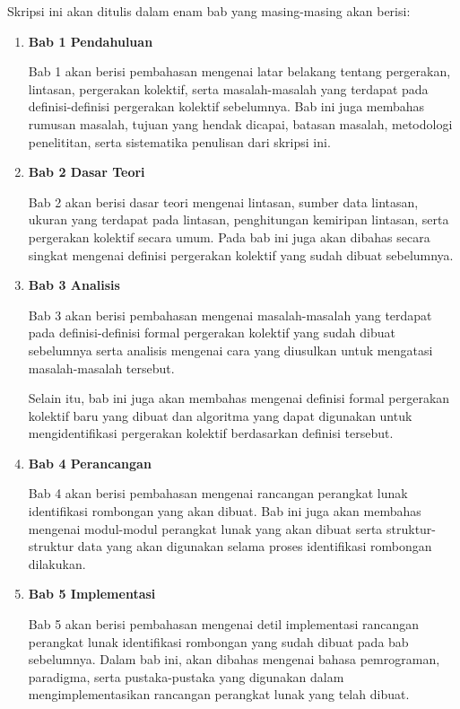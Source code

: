 Skripsi ini akan ditulis dalam enam bab yang masing-masing akan berisi:

\begin{enumerate}
    \item \textbf{Bab 1 Pendahuluan}
    
    Bab 1 akan berisi pembahasan mengenai latar belakang tentang pergerakan, lintasan, pergerakan kolektif, serta masalah-masalah yang terdapat pada definisi-definisi pergerakan kolektif sebelumnya. Bab ini juga membahas rumusan masalah, tujuan yang hendak dicapai, batasan masalah, metodologi penelititan, serta sistematika penulisan dari skripsi ini.
    
    \item \textbf{Bab 2 Dasar Teori}
    
    Bab 2 akan berisi dasar teori mengenai lintasan, sumber data lintasan, ukuran yang terdapat pada lintasan, penghitungan kemiripan lintasan, serta pergerakan kolektif secara umum. Pada bab ini juga akan dibahas secara singkat mengenai definisi pergerakan kolektif yang sudah dibuat sebelumnya.
    
    \item \textbf{Bab 3 Analisis}
    
    Bab 3 akan berisi pembahasan mengenai masalah-masalah yang terdapat pada definisi-definisi formal pergerakan kolektif yang sudah dibuat sebelumnya serta analisis mengenai cara yang diusulkan untuk mengatasi masalah-masalah tersebut.
    
    Selain itu, bab ini juga akan membahas mengenai definisi formal pergerakan kolektif baru yang dibuat dan algoritma yang dapat digunakan untuk mengidentifikasi pergerakan kolektif berdasarkan definisi tersebut.
    
    \item \textbf{Bab 4 Perancangan}
    
    Bab 4 akan berisi pembahasan mengenai rancangan perangkat lunak identifikasi rombongan yang akan dibuat. Bab ini juga akan membahas mengenai modul-modul perangkat lunak yang akan dibuat serta struktur-struktur data yang akan digunakan selama proses identifikasi rombongan dilakukan.
    
    \item \textbf{Bab 5 Implementasi}
    
    Bab 5 akan berisi pembahasan mengenai detil implementasi rancangan perangkat lunak identifikasi rombongan yang sudah dibuat pada bab sebelumnya. Dalam bab ini, akan dibahas mengenai bahasa pemrograman, paradigma, serta pustaka-pustaka yang digunakan dalam mengimplementasikan rancangan perangkat lunak yang telah dibuat.
    

\end{enumerate}
